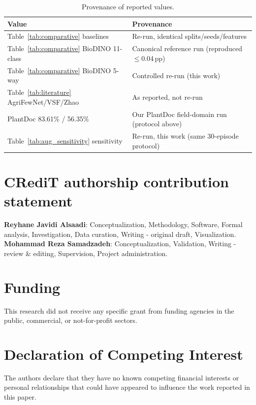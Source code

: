 \documentclass[preprint,12pt]{elsarticle}
\begin{document}
\begin{table}[htbp]
\centering
\caption{Provenance of reported values.}
\label{tab:provenance}
\footnotesize
\begin{tabularx}{\columnwidth}{l X}
\toprule
\textbf{Value} & \textbf{Provenance} \\
\midrule
Table~\ref{tab:comparative} baselines & Re-run, identical splits/seeds/features \\
Table~\ref{tab:comparative} BioDINO 11-class & Canonical reference run (reproduced $\le$0.04\,pp) \\
Table~\ref{tab:comparative} BioDINO 5-way & Controlled re-run (this work) \\
Table~\ref{tab:literature} AgriFewNet/VSF/Zhao & As reported, not re-run \\
PlantDoc 83.61\% / 56.35\% & Our PlantDoc field-domain run (protocol above) \\
Table~\ref{tab:aug_sensitivity} sensitivity & Re-run, this work (same 30-episode protocol) \\
\bottomrule
\end{tabularx}
\end{table}

\section*{CRediT authorship contribution statement}
\textbf{Reyhane Javidi Alsaadi}: Conceptualization, Methodology, Software, Formal analysis, Investigation, Data curation, Writing - original draft, Visualization.
\textbf{Mohammad Reza Samadzadeh}: Conceptualization, Validation, Writing - review \& editing, Supervision, Project administration.

\section*{Funding}
This research did not receive any specific grant from funding agencies in the public, commercial, or not-for-profit sectors.

\section*{Declaration of Competing Interest}
The authors declare that they have no known competing financial interests or personal relationships that could have appeared to influence the work reported in this paper.
\end{document}
